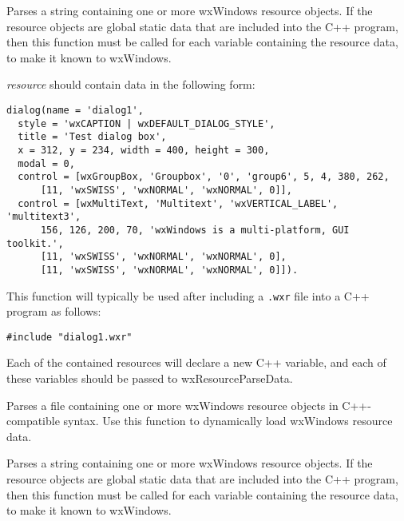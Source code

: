 
Parses a string containing one or more wxWindows resource objects. If
the resource objects are global static data that are included into the
C++ program, then this function must be called for each variable
containing the resource data, to make it known to wxWindows.

{\it resource} should contain data in the following form:

\begin{verbatim}
dialog(name = 'dialog1',
  style = 'wxCAPTION | wxDEFAULT_DIALOG_STYLE',
  title = 'Test dialog box',
  x = 312, y = 234, width = 400, height = 300,
  modal = 0,
  control = [wxGroupBox, 'Groupbox', '0', 'group6', 5, 4, 380, 262,
      [11, 'wxSWISS', 'wxNORMAL', 'wxNORMAL', 0]],
  control = [wxMultiText, 'Multitext', 'wxVERTICAL_LABEL', 'multitext3',
      156, 126, 200, 70, 'wxWindows is a multi-platform, GUI toolkit.',
      [11, 'wxSWISS', 'wxNORMAL', 'wxNORMAL', 0],
      [11, 'wxSWISS', 'wxNORMAL', 'wxNORMAL', 0]]).
\end{verbatim}

This function will typically be used after including a {\tt .wxr} file into
a C++ program as follows:

\begin{verbatim}
#include "dialog1.wxr"
\end{verbatim}

Each of the contained resources will declare a new C++ variable, and each
of these variables should be passed to wxResourceParseData.



Parses a file containing one or more wxWindows resource objects
in C++-compatible syntax. Use this function to dynamically load
wxWindows resource data.

\label{wxresourceparsestring}


Parses a string containing one or more wxWindows resource objects. If
the resource objects are global static data that are included into the
C++ program, then this function must be called for each variable
containing the resource data, to make it known to wxWindows.

